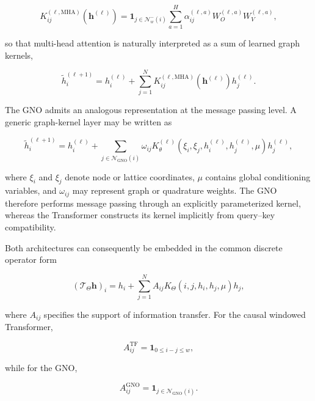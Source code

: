 \begin{equation}
\label{eq:193}
K_{ij}^{(\ell,\mathrm{MHA})}(\mathbf h^{(\ell)})=\mathbf1_{j\in\mathcal N_w^{-}(i)}\sum_{a=1}^{H}\alpha_{ij}^{(\ell,a)}W_O^{(\ell,a)}W_V^{(\ell,a)},
\end{equation}

so that multi-head attention is naturally interpreted as a sum of learned graph kernels,

\begin{equation}
\label{eq:194}
\widetilde h_i^{(\ell+1)}=h_i^{(\ell)}+\sum_{j=1}^{N}K_{ij}^{(\ell,\mathrm{MHA})}(\mathbf h^{(\ell)})h_j^{(\ell)}.
\end{equation}

The GNO admits an analogous representation at the message passing level. A generic graph-kernel layer may be written as

\begin{equation}
\label{eq:195}
\widetilde h_i^{(\ell+1)}=h_i^{(\ell)}+\sum_{j\in\mathcal N_{\mathrm{GNO}}(i)}\omega_{ij}K_{\theta}^{(\ell)}(\xi_i,\xi_j,h_i^{(\ell)},h_j^{(\ell)},\mu)h_j^{(\ell)},
\end{equation}

where \(\xi_{i}\) and \(\xi_{j}\) denote node or lattice coordinates, \(\mu\) contains global conditioning variables, and \(\omega_{i j}\) may represent graph or quadrature weights. The GNO therefore performs message passing through an explicitly parameterized kernel, whereas the Transformer constructs its kernel implicitly from query–key compatibility.

Both architectures can consequently be embedded in the common discrete operator form

\begin{equation}
\label{eq:196}
(\mathcal T_{\Theta}\mathbf h)_i=h_i+\sum_{j=1}^{N}A_{ij}K_{\Theta}(i,j,h_i,h_j,\mu)h_j,
\end{equation}

where \(A_{i j}\) specifies the support of information transfer. For the causal windowed Transformer,

\begin{equation}
\label{eq:197}
A_{ij}^{\mathrm{TF}}=\mathbf1_{0\le i-j\le w},
\end{equation}

while for the GNO,

\begin{equation}
\label{eq:198}
A_{ij}^{\mathrm{GNO}}=\mathbf1_{j\in\mathcal N_{\mathrm{GNO}}(i)}.
\end{equation}

